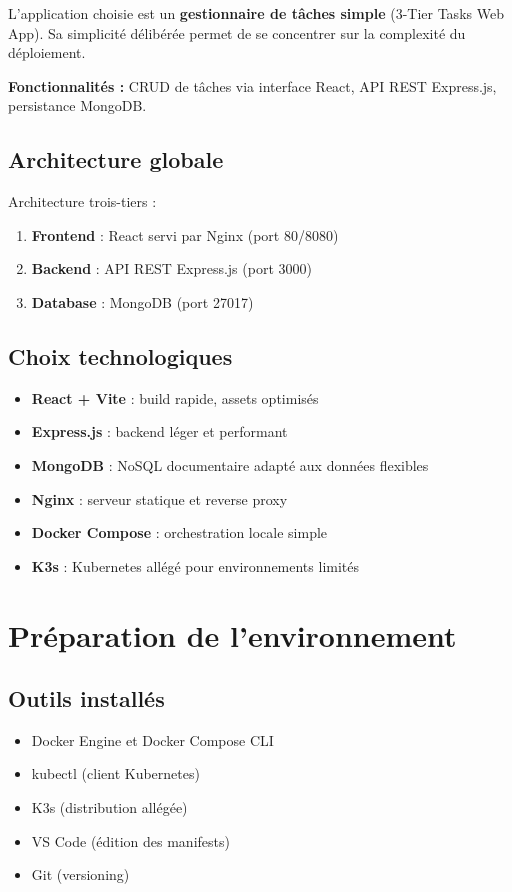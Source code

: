 \documentclass[12pt,a4paper]{report}
\begin{document}
L'application choisie est un \textbf{gestionnaire de tâches simple} (3-Tier Tasks Web App). Sa simplicité délibérée permet de se concentrer sur la complexité du déploiement.

\textbf{Fonctionnalités :} CRUD de tâches via interface React, API REST Express.js, persistance MongoDB.

\section{Architecture globale}

Architecture trois-tiers :
\begin{enumerate}
\item \textbf{Frontend} : React servi par Nginx (port 80/8080)
\item \textbf{Backend} : API REST Express.js (port 3000)
\item \textbf{Database} : MongoDB (port 27017)
\end{enumerate}

\section{Choix technologiques}
\begin{itemize}
\item \textbf{React + Vite} : build rapide, assets optimisés
\item \textbf{Express.js} : backend léger et performant
\item \textbf{MongoDB} : NoSQL documentaire adapté aux données flexibles
\item \textbf{Nginx} : serveur statique et reverse proxy
\item \textbf{Docker Compose} : orchestration locale simple
\item \textbf{K3s} : Kubernetes allégé pour environnements limités
\end{itemize}

\chapter{Préparation de l'environnement}

\section{Outils installés}
\begin{itemize}
\item Docker Engine et Docker Compose CLI
\item kubectl (client Kubernetes)
\item K3s (distribution allégée)
\item VS Code (édition des manifests)
\item Git (versioning)
\end{itemize}
\end{document}
